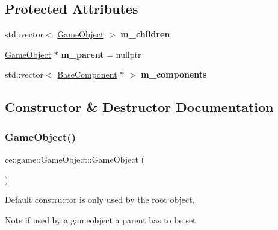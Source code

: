 \subsection*{Protected Attributes}
\begin{DoxyCompactItemize}
\item 
\mbox{\label{classce_1_1game_1_1_game_object_aaf7f530f3f33f9de4d688e5680ecb89b}} 
std\+::vector$<$ \hyperlink{classce_1_1game_1_1_game_object}{Game\+Object} $>$ {\bfseries m\+\_\+children}
\item 
\mbox{\label{classce_1_1game_1_1_game_object_a93aa7c45a4e23b65ebbb3aa3d79d34a6}} 
\hyperlink{classce_1_1game_1_1_game_object}{Game\+Object} $\ast$ {\bfseries m\+\_\+parent} = nullptr
\item 
\mbox{\label{classce_1_1game_1_1_game_object_a43334ef901188cf677db3be5bcad6766}} 
std\+::vector$<$ \hyperlink{classce_1_1game_1_1_base_component}{Base\+Component} $\ast$ $>$ {\bfseries m\+\_\+components}
\end{DoxyCompactItemize}


\subsection{Constructor \& Destructor Documentation}
\mbox{\label{classce_1_1game_1_1_game_object_a38079a556bd77da1c43d53b092b975ed}} 
\subsubsection{\texorpdfstring{Game\+Object()}{GameObject()}}
{\footnotesize\ttfamily ce\+::game\+::\+Game\+Object\+::\+Game\+Object (\begin{DoxyParamCaption}{ }\end{DoxyParamCaption})\hspace{0.3cm}{\ttfamily [inline]}}



Default constructor is only used by the root object. 

Note if used by a gameobject a parent has to be set 

